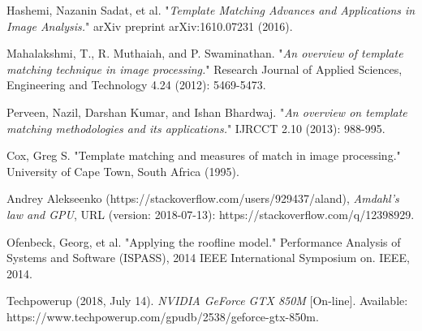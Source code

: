 \cleardoublepage
{}
{}
\begin{thebibliography}{99}

Hashemi, Nazanin Sadat, et al. "\textit{Template Matching Advances and Applications in Image Analysis.}" arXiv preprint arXiv:1610.07231 (2016).


Mahalakshmi, T., R. Muthaiah, and P. Swaminathan. "\textit{An overview of template matching technique in image processing.}" Research Journal of Applied Sciences, Engineering and Technology 4.24 (2012): 5469-5473.

Perveen, Nazil, Darshan Kumar, and Ishan Bhardwaj. "\textit{An overview on template matching methodologies and its applications.}" IJRCCT 2.10 (2013): 988-995.

Cox, Greg S. "Template matching and measures of match in image processing." University of Cape Town, South Africa (1995).

Andrey Alekseenko (https://stackoverflow.com/users/929437/aland), \textit{Amdahl's law and GPU}, URL (version: 2018-07-13): https://stackoverflow.com/q/12398929.

Ofenbeck, Georg, et al. "Applying the roofline model." Performance Analysis of Systems and Software (ISPASS), 2014 IEEE International Symposium on. IEEE, 2014.

Techpowerup (2018, July 14). \textit{NVIDIA GeForce GTX 850M} [On-line]. Available: https://www.techpowerup.com/gpudb/2538/geforce-gtx-850m.

\end{thebibliography}
